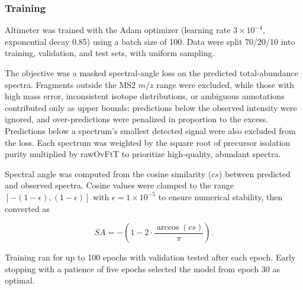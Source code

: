 \documentclass[pdflatex,sn-nature]{sn-jnl}
\begin{document}
\subsubsection{Training}\label{subsubsec:altimeter-training}
Altimeter was trained with the Adam optimizer (learning rate $3\times10^{-4}$, exponential decay 0.85) using a batch size of 100. Data were split 70/20/10 into training, validation, and test sets, with uniform sampling.  

The objective was a masked spectral-angle loss on the predicted total-abundance spectra. Fragments outside the MS2 $m/z$ range were excluded, while those with high mass error, inconsistent isotope distributions, or ambiguous annotations contributed only as upper bounds: predictions below the observed intensity were ignored, and over-predictions were penalized in proportion to the excess. Predictions below a spectrum's smallest detected signal were also excluded from the loss. Each spectrum was weighted by the square root of precursor isolation purity multiplied by rawOvFtT to prioritize high-quality, abundant spectra.  

Spectral angle was computed from the cosine similarity ($cs$) between predicted and observed spectra. Cosine values were clamped to the range $[-(1-\epsilon), (1-\epsilon)]$ with $\epsilon = 1\times10^{-5}$ to ensure numerical stability, then converted as  

\[
SA = -\left(1 - 2 \cdot \frac{\arccos(cs)}{\pi}\right).
\]  

Training ran for up to 100 epochs with validation tested after each epoch. Early stopping with a patience of five epochs selected the model from epoch 30 as optimal.  

\end{document}
